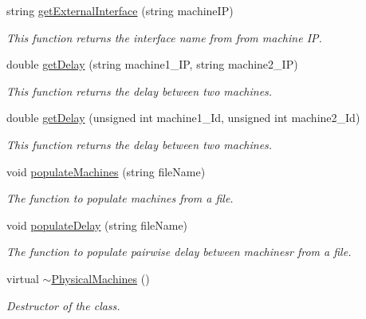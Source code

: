 \begin{DoxyCompactItemize}
string \hyperlink{classPhysicalMachines_ab2d18167610b014810fabd5b8401ed48}{get\-External\-Interface} (string machine\-I\-P)
\begin{DoxyCompactList}\small\item\em \-This function returns the interface name from from machine \-I\-P. \end{DoxyCompactList}\item 
double \hyperlink{classPhysicalMachines_a44c5d5cab7a27edc1f98aed1058131f6}{get\-Delay} (string machine1\-\_\-\-I\-P, string machine2\-\_\-\-I\-P)
\begin{DoxyCompactList}\small\item\em \-This function returns the delay between two machines. \end{DoxyCompactList}\item 
double \hyperlink{classPhysicalMachines_a25b312b0688b38d14b92a1ebfb03858c}{get\-Delay} (unsigned int machine1\-\_\-\-Id, unsigned int machine2\-\_\-\-Id)
\begin{DoxyCompactList}\small\item\em \-This function returns the delay between two machines. \end{DoxyCompactList}\item 
void \hyperlink{classPhysicalMachines_a8d47ef94538114cb650ab679d0a76c92}{populate\-Machines} (string file\-Name)
\begin{DoxyCompactList}\small\item\em \-The function to populate machines from a file. \end{DoxyCompactList}\item 
void \hyperlink{classPhysicalMachines_a0e9b8df49cfce6da3f09a9de34660ec3}{populate\-Delay} (string file\-Name)
\begin{DoxyCompactList}\small\item\em \-The function to populate pairwise delay between machinesr from a file. \end{DoxyCompactList}\item 
\hypertarget{classPhysicalMachines_a5031d5fc1875ca216b7bbf67dadc289d}{virtual \hyperlink{classPhysicalMachines_a5031d5fc1875ca216b7bbf67dadc289d}{$\sim$\-Physical\-Machines} ()}\label{classPhysicalMachines_a5031d5fc1875ca216b7bbf67dadc289d}

\begin{DoxyCompactList}\small\item\em \-Destructor of the class. \end{DoxyCompactList}\end{DoxyCompactItemize}
